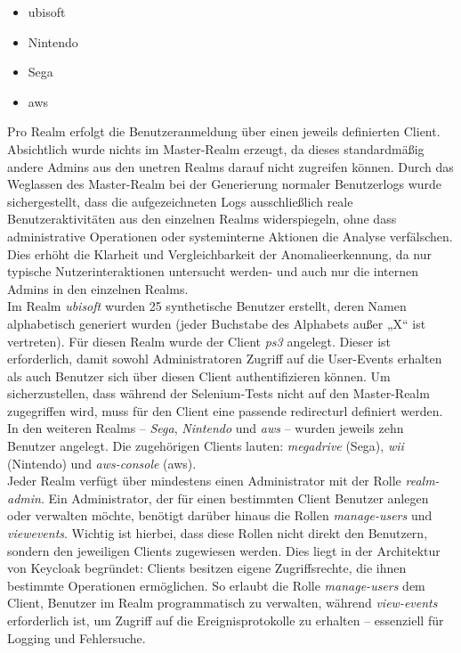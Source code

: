\documentclass[a4paper,12pt]{article}
\begin{document}
	\begin{itemize}
		\item ubisoft
		\item Nintendo
		\item Sega
		\item aws
	\end{itemize}
	Pro Realm erfolgt die Benutzeranmeldung über einen jeweils definierten Client. Absichtlich wurde nichts im Master-Realm erzeugt, da dieses standardmäßig andere Admins aus den unetren Realms darauf nicht zugreifen können. Durch das Weglassen des Master-Realm bei der Generierung normaler Benutzerlogs wurde sichergestellt, dass die aufgezeichneten Logs ausschließlich reale Benutzeraktivitäten aus den einzelnen Realms widerspiegeln, ohne dass administrative Operationen oder systeminterne Aktionen die Analyse verfälschen. Dies erhöht die Klarheit und Vergleichbarkeit der Anomalieerkennung, da nur typische Nutzerinteraktionen untersucht werden- und auch nur die internen Admins in den einzelnen Realms.
	\\[0.5em]
	Im Realm \textit{ubisoft} wurden 25 synthetische Benutzer erstellt, deren Namen alphabetisch generiert wurden (jeder Buchstabe des Alphabets außer „X“ ist vertreten). Für diesen Realm wurde der Client \textit{ps3} angelegt. Dieser ist erforderlich, damit sowohl Administratoren Zugriff auf die User-Events erhalten als auch Benutzer sich über diesen Client authentifizieren können. Um sicherzustellen, dass während der Selenium-Tests nicht auf den Master-Realm zugegriffen wird, muss für den Client eine passende \gls{redirecturl} definiert werden.
	\\[0.5em]
	In den weiteren Realms – \textit{Sega}, \textit{Nintendo} und \textit{aws} – wurden jeweils zehn Benutzer angelegt. Die zugehörigen Clients lauten: \textit{megadrive} (Sega), \textit{wii} (Nintendo) und \textit{aws-console} (aws).
	\\[0.5em]
	Jeder Realm verfügt über mindestens einen Administrator mit der Rolle \textit{realm-admin}. Ein Administrator, der für einen bestimmten Client Benutzer anlegen oder verwalten möchte, benötigt darüber hinaus die Rollen \textit{manage-users} und \textit{\gls{viewevents}}. Wichtig ist hierbei, dass diese Rollen nicht direkt den Benutzern, sondern den jeweiligen Clients zugewiesen werden. Dies liegt in der Architektur von Keycloak begründet: Clients besitzen eigene Zugriffsrechte, die ihnen bestimmte Operationen ermöglichen. So erlaubt die Rolle \textit{manage-users} dem Client, Benutzer im Realm programmatisch zu verwalten, während \textit{view-events} erforderlich ist, um Zugriff auf die Ereignisprotokolle zu erhalten – essenziell für Logging und Fehlersuche.
\end{document}
